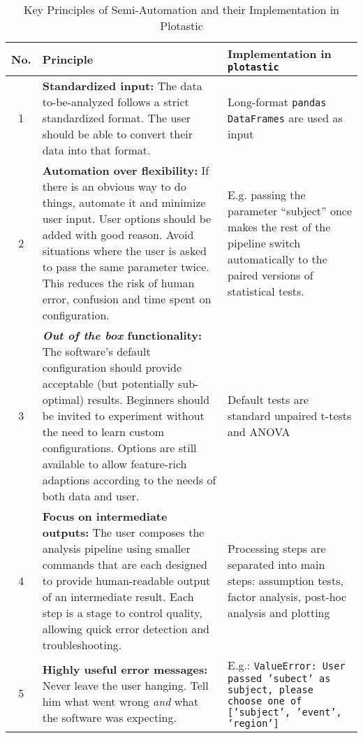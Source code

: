 \begin{table}[h]
      \caption{Key Principles of Semi-Automation and their Implementation in Plotastic}
      \footnotesize
      \centering
      \label{tab:semi-auto-principles}
      \begin{tabular}{|c|p{}|p{}|}
            \hline
            \textbf{No.}
             & \textbf{Principle}
             & \textbf{Implementation in \texttt{plotastic}}
            \\
            \hline
            1
             & \textbf{Standardized input:} The data to-be-analyzed follows a
            strict standardized format. The user should be able to convert their
            data into that format.
             & Long-format \texttt{pandas} \texttt{DataFrames} are used as input
            \\
            \hline
            2
             & \textbf{Automation over flexibility:} If there is an obvious way
            to do things, automate it and minimize user input. User options
            should be added with good reason. Avoid situations where the user is
            asked to pass the same parameter twice. This reduces the risk of
            human error, confusion and time spent on configuration.
             & E.g.
            passing the parameter ``subject'' once makes the rest of the
            pipeline switch automatically to the paired versions of statistical
            tests.
            \\
            \hline
            3%
             & \textbf{\emph{Out of the box} functionality:} The software's
            default configuration should provide acceptable (but potentially
            sub-optimal) results. Beginners should be invited to experiment
            without the need to learn custom configurations. Options are still
            available to allow feature-rich adaptions according to the needs of
            both data and user.%
             & Default tests are standard unpaired t-tests and ANOVA             %
            \\%
            \hline
            4
             & \textbf{Focus on intermediate outputs:} The user composes the
            analysis pipeline using smaller commands that are each designed to
            provide human-readable output of an intermediate result. Each step
            is a stage to control quality, allowing quick error detection and
            troubleshooting.
             & Processing steps are separated into main steps:
            assumption tests, factor analysis, post-hoc analysis and plotting
            \\
            \hline
            5
             & \textbf{Highly useful error messages:} Never leave the user
            hanging. Tell him what went wrong \emph{and} what the software was
            expecting.
             & E.g.: \texttt{ValueError: User passed 'subect' as
            subject, please choose one of ['subject', 'event', 'region']}        \\
            \hline
      \end{tabular}
\end{table}



